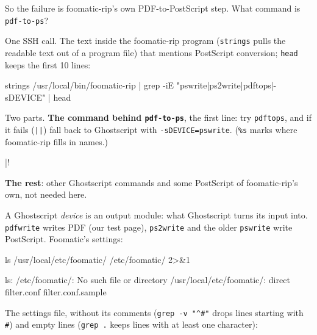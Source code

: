 \documentclass[11pt,a4paper]{article}
\begin{document}
So the failure is foomatic-rip's own PDF-to-PostScript step. What command is \texttt{pdf-to-ps}?

One SSH call. The text inside the foomatic-rip program (\texttt{strings} pulls the readable text out of a program file) that mentions PostScript conversion; \texttt{head} keeps the first 10 lines:

\begin{mine}
strings /usr/local/bin/foomatic-rip | grep -iE "pswrite|ps2write|pdftops|-sDEVICE" | head
\end{mine}
Two parts. \textbf{The command behind \texttt{pdf-to-ps}}, the first line: try \texttt{pdftops}, and if it fails (\texttt{||}) fall back to Ghostscript with \texttt{-sDEVICE=pswrite}. (\texttt{\%s} marks where foomatic-rip fills in names.)

\begin{cmdout}
|!%
\end{cmdout}

\textbf{The rest}: other Ghostscript commands and some PostScript of foomatic-rip's own, not needed here.

\begin{cmdout}
|~%
|~/cupsWrite { %
|~        (PAGE: )cupsWrite             %
|~        16 string cvs cupsWrite            %
|~        ( )cupsWrite                %
|~        16 string cvs cupsWrite            %
|~        (\n)cupsWrite                %
|~%
\end{cmdout}

A Ghostscript \emph{device} is an output module: what Ghostscript turns its input into. \texttt{pdfwrite} writes PDF (our test page), \texttt{ps2write} and the older \texttt{pswrite} write PostScript. Foomatic's settings:

\begin{mine}
ls /usr/local/etc/foomatic/ /etc/foomatic/ 2>&1
\end{mine}
\begin{cmdout}
ls: /etc/foomatic/: No such file or directory
/usr/local/etc/foomatic/:
direct
filter.conf
filter.conf.sample
\end{cmdout}
The settings file, without its comments (\texttt{grep -v "\^{}\#"} drops lines starting with \texttt{\#}) and empty lines (\texttt{grep .} keeps lines with at least one character):
\end{document}

